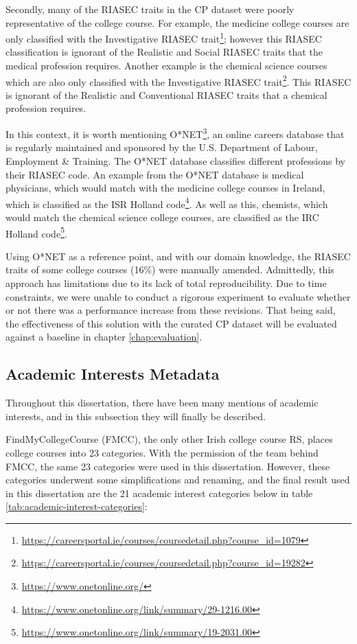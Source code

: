 Secondly, many of the RIASEC traits in the CP dataset were poorly representative of the college course.
For example, the medicine college courses are only classified with the Investigative RIASEC trait\footnote{\url{https://careersportal.ie/courses/coursedetail.php?course_id=1079}}; however 
this RIASEC classification is ignorant of the Realistic and Social RIASEC traits that the medical profession requires.
Another example is the chemical science courses which are also only classified with the Investigative RIASEC trait\footnote{\url{https://careersportal.ie/courses/coursedetail.php?course_id=19282}}.
This RIASEC is ignorant of the Realistic and Conventional RIASEC traits that a chemical profession requires.

In this context, it is worth mentioning O*NET\footnote{\url{https://www.onetonline.org/}}, an online careers database
that is regularly maintained and 
sponsored by the U.S. Department of Labour, Employment \& Training.
The O*NET database classifies different professions by their RIASEC code.
An example from the O*NET database is medical physicians, which would match with the medicine college courses in Ireland, 
which is classified as the ISR Holland code\footnote{\url{https://www.onetonline.org/link/summary/29-1216.00}}.
As well as this, chemists, which would match the chemical science college courses, 
are classified as the IRC Holland code\footnote{\url{https://www.onetonline.org/link/summary/19-2031.00}}.

Using O*NET as a reference point, and with our domain knowledge, 
the RIASEC traits of some college courses (16\%) were manually amended.
Admittedly, this approach has limitations due to its lack of total reproducibility.
Due to time constraints, we were unable to conduct a rigorous experiment to evaluate whether or not there was a performance 
increase from these revisions.
That being said, the effectiveness 
of this solution with the curated CP dataset will be evaluated against a baseline in chapter \ref{chap:evaluation}.

\subsection{Academic Interests Metadata}
\label{sec:academic-interests}

Throughout this dissertation, there have been many mentions of academic interests,
and in this subsection they will finally be described.

FindMyCollegeCourse (FMCC), the only other Irish college course RS, places college courses into 23 categories.
With the permission of the team behind FMCC, the same 23 categories were used in this dissertation.
However, these categories underwent some simplifications and renaming, and the final result used in this dissertation
are the 21 academic interest categories below in table \ref{tab:academic-interest-categories}:

